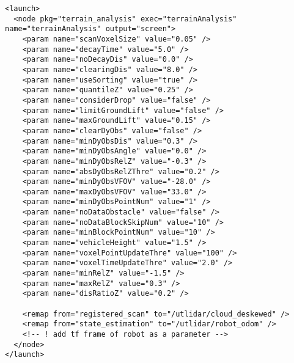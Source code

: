 \newpage
\begin{lstlisting}[style=xml, caption={Terrain analysis launch file}, label={lst:terrain_analysis_launch}]
<launch>
  <node pkg="terrain_analysis" exec="terrainAnalysis" name="terrainAnalysis" output="screen">
    <param name="scanVoxelSize" value="0.05" />
    <param name="decayTime" value="5.0" />
    <param name="noDecayDis" value="0.0" />
    <param name="clearingDis" value="8.0" />
    <param name="useSorting" value="true" />
    <param name="quantileZ" value="0.25" />
    <param name="considerDrop" value="false" />
    <param name="limitGroundLift" value="false" />
    <param name="maxGroundLift" value="0.15" />
    <param name="clearDyObs" value="false" />
    <param name="minDyObsDis" value="0.3" />
    <param name="minDyObsAngle" value="0.0" />
    <param name="minDyObsRelZ" value="-0.3" />
    <param name="absDyObsRelZThre" value="0.2" />
    <param name="minDyObsVFOV" value="-28.0" />
    <param name="maxDyObsVFOV" value="33.0" />
    <param name="minDyObsPointNum" value="1" />
    <param name="noDataObstacle" value="false" />
    <param name="noDataBlockSkipNum" value="10" />
    <param name="minBlockPointNum" value="10" />
    <param name="vehicleHeight" value="1.5" />
    <param name="voxelPointUpdateThre" value="100" />
    <param name="voxelTimeUpdateThre" value="2.0" />
    <param name="minRelZ" value="-1.5" />
    <param name="maxRelZ" value="0.3" />
    <param name="disRatioZ" value="0.2" />
    
    <remap from="registered_scan" to="/utlidar/cloud_deskewed" />
    <remap from="state_estimation" to="/utlidar/robot_odom" />
    <!-- ! add tf frame of robot as a parameter -->
  </node>
</launch>  
\end{lstlisting}

